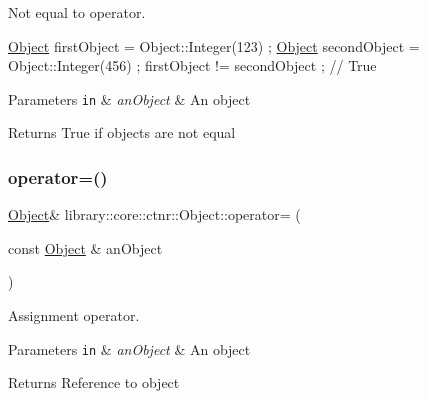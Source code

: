 Not equal to operator. 


\begin{DoxyCode}
\hyperlink{classlibrary_1_1core_1_1ctnr_1_1_object_a51bb72dec3a1b2738e0ad92b977b8d8d}{Object} firstObject = Object::Integer(123) ;
\hyperlink{classlibrary_1_1core_1_1ctnr_1_1_object_a51bb72dec3a1b2738e0ad92b977b8d8d}{Object} secondObject = Object::Integer(456) ;
firstObject != secondObject ; \textcolor{comment}{// True}
\end{DoxyCode}



\begin{DoxyParams}[1]{Parameters}
\mbox{\tt in}  & {\em an\+Object} & An object \\
\hline
\end{DoxyParams}
\begin{DoxyReturn}{Returns}
True if objects are not equal 
\end{DoxyReturn}
\mbox{\label{classlibrary_1_1core_1_1ctnr_1_1_object_acbc5a6b4e2971d1cb977867d086832fe}} 
\subsubsection{\texorpdfstring{operator=()}{operator=()}}
{\footnotesize\ttfamily \hyperlink{classlibrary_1_1core_1_1ctnr_1_1_object}{Object}\& library\+::core\+::ctnr\+::\+Object\+::operator= (\begin{DoxyParamCaption}\item[{const \hyperlink{classlibrary_1_1core_1_1ctnr_1_1_object}{Object} \&}]{an\+Object }\end{DoxyParamCaption})}



Assignment operator. 


\begin{DoxyParams}[1]{Parameters}
\mbox{\tt in}  & {\em an\+Object} & An object \\
\hline
\end{DoxyParams}
\begin{DoxyReturn}{Returns}
Reference to object 
\end{DoxyReturn}
\mbox{\label{classlibrary_1_1core_1_1ctnr_1_1_object_a543801cb9c7c22432603aca5435595e9}} 
